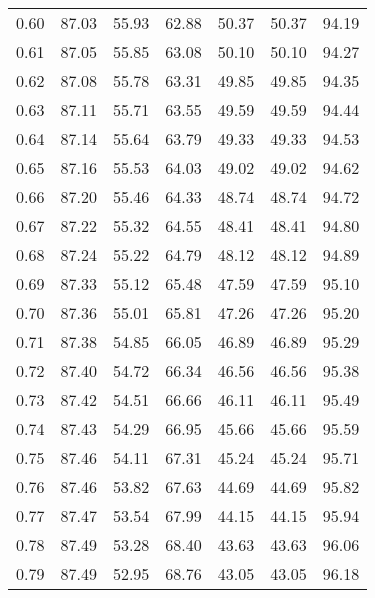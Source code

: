 \begin{tabular}{|c|c|c|c|c|c|c|}
      0.60 &     87.03 &     55.93 &      62.88 &   50.37 &      50.37 &         94.19 \\
      0.61 &     87.05 &     55.85 &      63.08 &   50.10 &      50.10 &         94.27 \\
      0.62 &     87.08 &     55.78 &      63.31 &   49.85 &      49.85 &         94.35 \\
      0.63 &     87.11 &     55.71 &      63.55 &   49.59 &      49.59 &         94.44 \\
      0.64 &     87.14 &     55.64 &      63.79 &   49.33 &      49.33 &         94.53 \\
      0.65 &     87.16 &     55.53 &      64.03 &   49.02 &      49.02 &         94.62 \\
      0.66 &     87.20 &     55.46 &      64.33 &   48.74 &      48.74 &         94.72 \\
      0.67 &     87.22 &     55.32 &      64.55 &   48.41 &      48.41 &         94.80 \\
      0.68 &     87.24 &     55.22 &      64.79 &   48.12 &      48.12 &         94.89 \\
      0.69 &     87.33 &     55.12 &      65.48 &   47.59 &      47.59 &         95.10 \\
      0.70 &     87.36 &     55.01 &      65.81 &   47.26 &      47.26 &         95.20 \\
      0.71 &     87.38 &     54.85 &      66.05 &   46.89 &      46.89 &         95.29 \\
      0.72 &     87.40 &     54.72 &      66.34 &   46.56 &      46.56 &         95.38 \\
      0.73 &     87.42 &     54.51 &      66.66 &   46.11 &      46.11 &         95.49 \\
      0.74 &     87.43 &     54.29 &      66.95 &   45.66 &      45.66 &         95.59 \\
      0.75 &     87.46 &     54.11 &      67.31 &   45.24 &      45.24 &         95.71 \\
      0.76 &     87.46 &     53.82 &      67.63 &   44.69 &      44.69 &         95.82 \\
      0.77 &     87.47 &     53.54 &      67.99 &   44.15 &      44.15 &         95.94 \\
      0.78 &     87.49 &     53.28 &      68.40 &   43.63 &      43.63 &         96.06 \\
      0.79 &     87.49 &     52.95 &      68.76 &   43.05 &      43.05 &         96.18 \\

\end{tabular}
